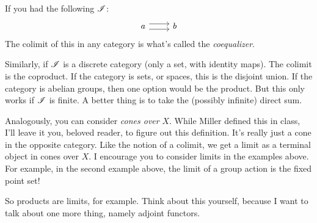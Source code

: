 If you had the following $\mathscr I$:
\begin{equation*}
    \begin{tikzcd}
	a\ar[r,shift left=.75ex]\ar[r,shift right=.75ex] & b
    \end{tikzcd}
\end{equation*}
The colimit of this in any category is what's called the \emph{coequalizer}.

Similarly, if $\mathscr I$ is a discrete category (only a set, with identity maps). The colimit is the coproduct. If the category is sets, or spaces, this is the disjoint union. If the category is abelian groups, then one option would be the product. But this only works if $\mathscr I$ is finite. A better thing is to take the (possibly infinite) direct sum.

\begin{remark}
    Analogously, you can consider \emph{cones over} $X$. While Miller defined this in class, I'll leave it you, beloved reader, to figure out this definition. It's really just a cone in the opposite category. Like the notion of a colimit, we get a limit as a terminal object in cones over $X$. I encourage you to consider limits in the examples above. For example, in the second example above, the limit of a group action is the fixed point set!
\end{remark}
So products are limits, for example. Think about this yourself, because I want to talk about one more thing, namely adjoint functors.
